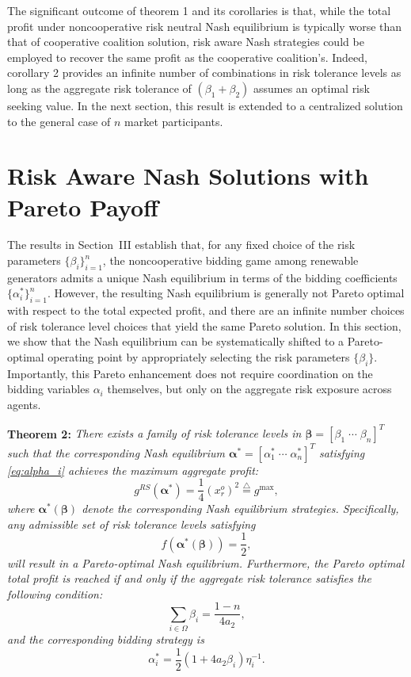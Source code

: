 \documentclass[conference]{IEEEtran}
\begin{document}
The significant outcome of theorem 1 and its corollaries is that, while the total profit under noncooperative risk neutral Nash equilibrium is typically worse than that of cooperative coalition solution, risk aware Nash strategies
could be employed to recover the same profit as the cooperative coalition's. Indeed, corollary 2 provides an infinite number of combinations in risk tolerance levels as long as the aggregate risk tolerance of $(\beta_1+\beta_2)$ assumes an optimal risk seeking value. In the next section, this result is extended to a centralized solution to the general case of $n$ market participants. 

\section{Risk Aware Nash Solutions with Pareto Payoff}

The results in Section~III establish that, for any fixed choice of the
risk parameters $\{\beta_i\}_{i=1}^n$, the noncooperative bidding game
among renewable generators admits a unique Nash equilibrium in terms of
the bidding coefficients $\{\alpha_i^\ast\}_{i=1}^n$.
However, the resulting Nash equilibrium is generally not Pareto optimal
with respect to the total expected profit, and there are an infinite number choices of risk tolerance level choices that yield the same Pareto solution. In this section, we show that the Nash equilibrium can be systematically
shifted to a Pareto-optimal operating point by appropriately selecting
the risk parameters $\{\beta_i\}$.
Importantly, this Pareto enhancement does not require coordination on
the bidding variables $\alpha_i$ themselves, but only on the aggregate
risk exposure across agents.

\noindent\textbf{Theorem 2:} {\it There exists a family of risk tolerance levels in  $\boldsymbol{\beta}=[\beta_1 \; \cdots \; \beta_n]^T$ such that the corresponding Nash equilibrium  $\boldsymbol{\alpha}^*=[\alpha_1^* \; \cdots \; \alpha_n^*]^T$ satisfying \eqref{eq:alpha_i} achieves the maximum aggregate profit:
\[
g^{RS}(\boldsymbol{\alpha}^*)  = \frac{1}{4}(x_r^o)^2 \stackrel{\triangle}{=} g^{\max},
\]
where $\boldsymbol{\alpha}^*(\boldsymbol{\beta})$ denote the corresponding Nash equilibrium strategies. 
Specifically, any admissible set of risk tolerance levels satisfying
\begin{equation}
f(\boldsymbol{\alpha}^*(\boldsymbol{\beta})) = \frac{1}{2}, \label{eq:pareto_condition}
\end{equation}
will result in a Pareto-optimal Nash equilibrium. Furthermore, the Pareto optimal total profit is reached if and only if the aggregate risk tolerance satisfies the following condition:
\begin{equation}
\sum_{i\in\Omega} \beta_i = \frac{1-n}{4a_2},
\label{eq:beta_sum_condition}
\end{equation}
and the corresponding bidding strategy is 
\begin{equation}
    \alpha_i^* = \frac{1}{2}(1+4a_2\beta_i)\eta_i^{-1}. \label{eq:alpha_optimal}
\end{equation}}
\end{document}
